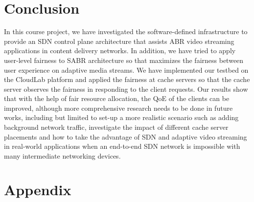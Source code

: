 \documentclass[12pt]{article}
\begin{document}
\section{Conclusion}
In this course project, we have investigated the software-defined infrastructure to provide an SDN control plane architecture that assists ABR video streaming applications in content delivery networks. In addition, we have tried to apply user-level fairness to SABR architecture so that maximizes the fairness between user experience on adaptive media streams. We have implemented our testbed on the CloudLab platform and applied the fairness at cache servers so that the cache server observes the fairness in responding to the client requests. Our results show that with the help of fair resource allocation, the QoE of the clients can be improved, although more comprehensive research needs to be done in future works, including but limited to set-up a more realistic scenario such as adding background network traffic, investigate the impact of different cache server placements and how to take the advantage of SDN and adaptive video streaming in real-world applications when an end-to-end SDN network is impossible with many intermediate networking devices.

\printbibliography[heading=bibnumbered]

\newpage

\section{Appendix}
\end{document}
